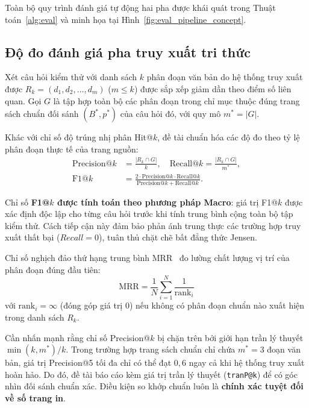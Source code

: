 Toàn bộ quy trình đánh giá tự động hai pha được khái quát trong Thuật toán~\ref{alg:eval} và minh họa tại Hình~\ref{fig:eval_pipeline_concept}.

\subsection{Độ đo đánh giá pha truy xuất tri thức}
\label{sec:retrieval_eval_def}
Xét câu hỏi kiểm thử với danh sách $k$ phân đoạn văn bản do hệ thống truy xuất được $R_k = (d_1, d_2, \dots, d_m)$ ($m \leq k$) được sắp xếp giảm dần theo điểm số liên quan. Gọi $G$ là tập hợp toàn bộ các phân đoạn trong chỉ mục thuộc đúng trang sách chuẩn đối sánh $(B^{*}, p^{*})$ của câu hỏi đó, với quy mô $m^{*} = |G|$.

Khác với chỉ số độ trúng nhị phân Hit@$k$, đề tài chuẩn hóa các độ đo theo tỷ lệ phân đoạn thực tế của trang nguồn:
\begin{align}
\mathrm{Precision@}k &= \frac{|R_k \cap G|}{k}, \quad \mathrm{Recall@}k = \frac{|R_k \cap G|}{m^{*}}, \\
\mathrm{F1@}k &= \frac{2 \cdot \mathrm{Precision@}k \cdot \mathrm{Recall@}k}{\mathrm{Precision@}k + \mathrm{Recall@}k}.
\end{align}

Chỉ số \textbf{F1@$k$ được tính toán theo phương pháp Macro}: giá trị F1@$k$ được xác định độc lập cho từng câu hỏi trước khi tính trung bình cộng toàn bộ tập kiểm thử. Cách tiếp cận này đảm bảo phản ánh trung thực các trường hợp truy xuất thất bại ($Recall = 0$), tuân thủ chặt chẽ bất đẳng thức Jensen.

Chỉ số nghịch đảo thứ hạng trung bình MRR~\cite{voorhees1999trec} đo lường chất lượng vị trí của phân đoạn đúng đầu tiên:
\begin{equation}
\mathrm{MRR} = \frac{1}{N}\sum_{i=1}^{N} \frac{1}{\mathrm{rank}_i}
\end{equation}
với $\mathrm{rank}_i = \infty$ (đóng góp giá trị $0$) nếu không có phân đoạn chuẩn nào xuất hiện trong danh sách $R_k$.

Cần nhấn mạnh rằng chỉ số Precision@$k$ bị chặn trên bởi giới hạn trần lý thuyết $\min(k, m^{*})/k$. Trong trường hợp trang sách chuẩn chỉ chứa $m^{*} = 3$ đoạn văn bản, giá trị Precision@5 tối đa chỉ có thể đạt $0{,}6$ ngay cả khi hệ thống truy xuất hoàn hảo. Do đó, đề tài báo cáo kèm giá trị trần lý thuyết (\texttt{tranP@k}) để có góc nhìn đối sánh chuẩn xác. Điều kiện so khớp chuẩn luôn là \textbf{chính xác tuyệt đối về số trang in}.

